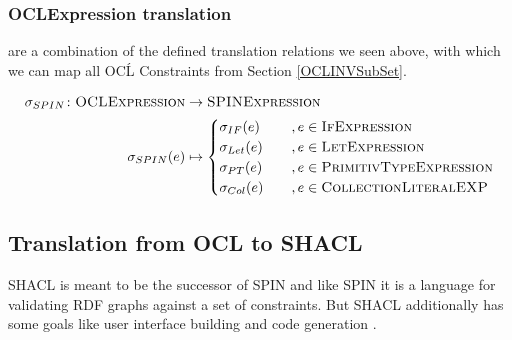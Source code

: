 \documentclass[runningheads]{llncs}
\begin{document}
\subsubsection{OCLExpression translation}
are a combination of the defined translation relations we seen above, with which we can map all OCĹ Constraints from Section \ref{OCLINVSubSet}.
\begin{definition}
    \begin{align*}
        \sigma_{SPIN}\colon\textsc{OCLExpression} & \to\textsc{SPINExpression} \\
        \sigma_{SPIN}(e)                          & \mapsto
        \begin{cases}
            \sigma_{IF}(e)  & \quad , e \in \textsc{IfExpression}           \\
            \sigma_{Let}(e) & \quad , e \in \textsc{LetExpression}          \\
            \sigma_{PT}(e)  & \quad , e \in \textsc{PrimitivTypeExpression} \\
            \sigma_{Col}(e) & \quad , e \in \textsc{CollectionLiteralEXP}
        \end{cases}
    \end{align*}
    \label{OCLtoSPIN}
\end{definition}
\subsection{Translation from OCL to SHACL}
SHACL is meant to be the successor of SPIN and like SPIN it is a language for validating RDF graphs against a set of constraints.
But SHACL additionally has some goals like user interface building and code generation \cite{knublauchshapes}.
\end{document}
